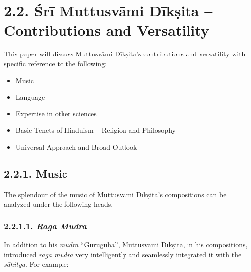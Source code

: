 \section*{2.2. Śrī Muttusvāmi Dīkṣita – Contributions and Versatility}

This paper will discuss Muttusvāmi Dīkṣita’s contributions and versatility with specific reference to the following:

\begin{itemize}
\itemsep=0pt
\item Music

 \item Language

 \item Expertise in other sciences

 \item Basic Tenets of Hinduism – Religion and Philosophy

 \item Universal Approach and Broad Outlook

\end{itemize}


\subsection*{2.2.1. Music}

The splendour of the music of Muttusvāmi Dīkṣita’s compositions can be analyzed under the following heads.

\subsubsection*{2.2.1.1. \textit{Rāga Mudrā}}

In addition to his \textit{mudrā} “Guruguha”, Muttusvāmi Dīkṣita, in his compositions, introduced \textit{rāga mudrā} very intelligently and seamlessly integrated it with the \textit{sāhitya}. For example:

